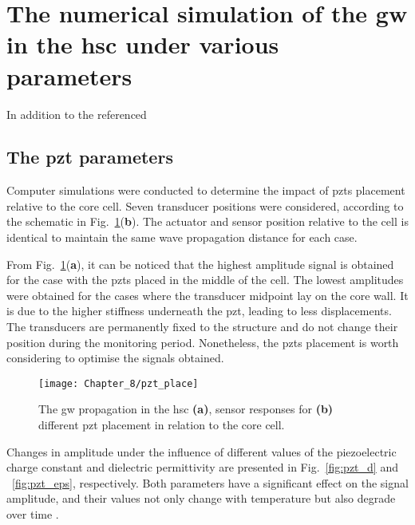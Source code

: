 \section{The numerical simulation of the \ac{gw} in the \ac{hsc} under various parameters}
\label{sec:parameters}

In addition to the referenced
\subsection{The \ac{pzt} parameters}
Computer simulations were conducted to determine the impact of \acp{pzt} placement relative to the core cell.
Seven transducer positions were considered, according to the schematic in Fig.~\ref{fig:pzt_place}(\textbf{b}).
The actuator and sensor position relative to the cell is identical to maintain the same wave propagation distance for each case.

From Fig.~\ref{fig:pzt_place}(\textbf{a}), it can be noticed that the highest amplitude signal is obtained for the case with the \acp{pzt} placed in the middle of the cell.
The lowest amplitudes were obtained for the cases where the transducer midpoint lay on the core wall.
It is due to the higher stiffness underneath the \ac{pzt}, leading to less displacements.
The transducers are permanently fixed to the structure and do not change their position during the monitoring period.
Nonetheless, the \acp{pzt} placement is worth considering to optimise the signals obtained.
\begin{figure}
	\begin{center}
		\texttt{[image: Chapter\_8/pzt\_place]}
	\end{center}
	\caption{The \acf{gw} propagation in the \acf{hsc} \textbf{(a)}, sensor responses for \textbf{(b)} different \acf{pzt} placement in relation to the core cell.}
	\label{fig:pzt_place}
\end{figure}

Changes in amplitude under the influence of different values of the piezoelectric charge constant and dielectric permittivity are presented in Fig.~\ref{fig:pzt_d} and ~\ref{fig:pzt_eps}, respectively.
Both parameters have a significant effect on the signal amplitude, and their values not only change with temperature but also degrade over time \cite{barzegar2001aging, deangelis2006p2o}.

